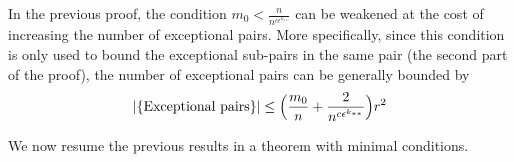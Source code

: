     \begin{remark}[Remark 4.15]
        In the previous proof, the condition $m_0 < \frac{n}{n^{c\epsilon^{k_{**}}}}$ can be
        weakened at the cost of increasing the number of exceptional pairs.
        More specifically, since this condition is only used to bound the exceptional sub-pairs in the same pair
        (the second part of the proof), the number of exceptional pairs can be generally bounded by
        \[
            |\{ \text{Exceptional pairs} \}|
                \leq \Bigl( \frac{m_0}{n} + \frac{2}{n^{c\epsilon^{k_{**}}}} \Bigr) r^2
        \]
    \end{remark}

    We now resume the previous results in a theorem with minimal conditions.


